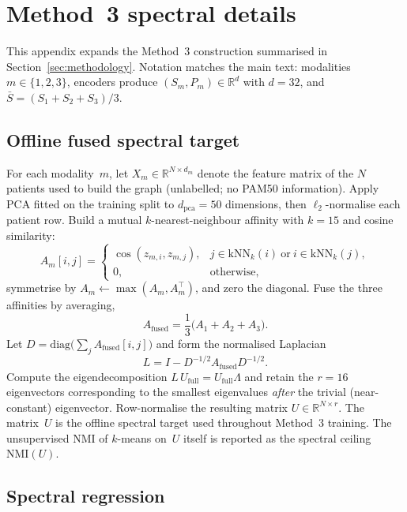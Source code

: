 \clearpage
\section{Method~3 spectral details}
\label{app:method3}

This appendix expands the Method~3 construction summarised in Section~\ref{sec:methodology}. Notation matches the main text: modalities $m\in\{1,2,3\}$, encoders produce $(S_m,P_m)\in\mathbb{R}^{d}$ with $d=32$, and $\bar{S}=(S_1+S_2+S_3)/3$.

\subsection{Offline fused spectral target}

For each modality~$m$, let $X_m\in\mathbb{R}^{N\times d_m}$ denote the feature matrix of the $N$ patients used to build the graph (unlabelled; no PAM50 information). Apply PCA fitted on the training split to $d_{\mathrm{pca}}=50$ dimensions, then $\ell_2$-normalise each patient row. Build a mutual $k$-nearest-neighbour affinity with $k=15$ and cosine similarity:
\begin{equation}
A_m[i,j]
=
\begin{cases}
\cos(z_{m,i},z_{m,j}), & j\in\mathrm{kNN}_k(i)\ \text{or}\ i\in\mathrm{kNN}_k(j),\\
0, & \text{otherwise},
\end{cases}
\end{equation}
symmetrise by $A_m\leftarrow\max(A_m,A_m^\top)$, and zero the diagonal. Fuse the three affinities by averaging,
\begin{equation}
A_{\mathrm{fused}}=\frac{1}{3}\bigl(A_1+A_2+A_3\bigr).
\end{equation}
Let $D=\mathrm{diag}\bigl(\sum_j A_{\mathrm{fused}}[i,j]\bigr)$ and form the normalised Laplacian
\begin{equation}
L = I - D^{-1/2} A_{\mathrm{fused}} D^{-1/2}.
\end{equation}
Compute the eigendecomposition $L\,U_{\mathrm{full}}=U_{\mathrm{full}}\Lambda$ and retain the $r=16$ eigenvectors corresponding to the smallest eigenvalues \emph{after} the trivial (near-constant) eigenvector. Row-normalise the resulting matrix $U\in\mathbb{R}^{N\times r}$. The matrix~$U$ is the offline spectral target used throughout Method~3 training. The unsupervised NMI of $k$-means on~$U$ itself is reported as the spectral ceiling $\mathrm{NMI}(U)$.

\subsection{Spectral regression}

